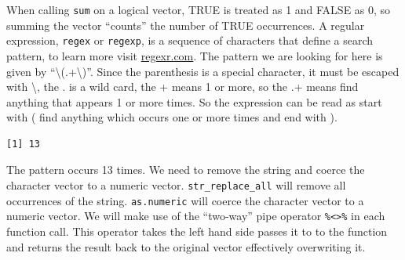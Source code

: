 \documentclass[]{book}
\newenvironment{Shaded}{\begin{snugshade}}{\end{snugshade}}
\newcommand{\CharTok}[1]{\textcolor[rgb]{0.31,0.60,0.02}{#1}}
\newcommand{\CommentTok}[1]{\textcolor[rgb]{0.56,0.35,0.01}{\textit{#1}}}
\newcommand{\DecValTok}[1]{\textcolor[rgb]{0.00,0.00,0.81}{#1}}
\newcommand{\KeywordTok}[1]{\textcolor[rgb]{0.13,0.29,0.53}{\textbf{#1}}}
\newcommand{\NormalTok}[1]{#1}
\newcommand{\OperatorTok}[1]{\textcolor[rgb]{0.81,0.36,0.00}{\textbf{#1}}}
\newcommand{\StringTok}[1]{\textcolor[rgb]{0.31,0.60,0.02}{#1}}
\begin{document}
When calling \texttt{sum} on a logical vector, TRUE is treated as 1 and FALSE as 0, so summing the vector ``counts'' the number of TRUE occurrences. A regular expression, \texttt{regex} or \texttt{regexp}, is a sequence of characters that define a search pattern, to learn more visit \href{https://regexr.com/}{regexr.com}. The pattern we are looking for here is given by ``\textbackslash{}(.+\textbackslash{})''. Since the parenthesis is a special character, it must be escaped with \textbackslash{}, the . is a wild card, the + means 1 or more, so the .+ means find anything that appears 1 or more times. So the expression can be read as start with ( find anything which occurs one or more times and end with ).

\begin{Shaded}
\end{Shaded}

\begin{verbatim}
[1] 13
\end{verbatim}

The pattern occurs 13 times. We need to remove the string and coerce the character vector to a numeric vector. \texttt{str\_replace\_all} will remove all occurrences of the string. \texttt{as.numeric} will coerce the character vector to a numeric vector. We will make use of the ``two-way'' pipe operator \texttt{\%\textless{}\textgreater{}\%} in each function call. This operator takes the left hand side passes it to to the function and returns the result back to the original vector effectively overwriting it.

\begin{Shaded}
\end{Shaded}
\end{document}
